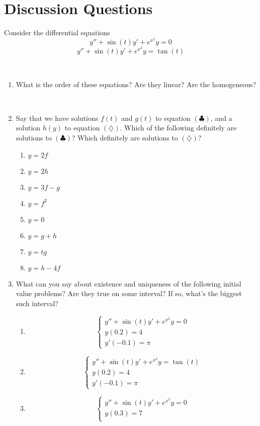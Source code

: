 \documentclass[12pt]{amsart}
\begin{document}
	
	\thispagestyle{empty}
	

	
	\section*{Discussion Questions}
	
	
	Consider the differential equations
	\begin{equation}\tag{$\clubsuit$} y'' + \sin(t) y' + e^{x^2} y = 0 \end{equation}
		\begin{equation}\tag{$\diamondsuit$} y'' + \sin(t) y' + e^{x^2} y = \tan(t) \end{equation}
	
	\
	
\begin{enumerate}
\item What is the order of these equations? Are they linear? Are the homogeneous?

\

\item Say that we have solutions $f(t)$ and $g(t)$  to equation $(\clubsuit)$, and a solution $h(y)$  to equation $(\diamondsuit)$. 
Which of the following definitely are solutions to $(\clubsuit)$? Which definitely are solutions to $(\diamondsuit)$? 
\begin{multicols}{4}
\begin{enumerate}
\item $y= 2f$
\item $y= 2h$
\item $y=3f-g$
\item $y=f^2$
\item $y=0$
\item $y=g+h$
\item $y=tg$
\item $y=h-4f$
\end{enumerate}
\end{multicols}

\item What can you say about existence and uniqueness of the following initial value problems? Are they true on some interval? If so, what's the biggest such interval?
\begin{multicols}{3}
\begin{enumerate}
\item \[ \begin{cases} y'' + \sin(t) y' + e^{x^2} y = 0 \\ 
y(0.2) = 4 \\
y'(-0.1) = \pi
\end{cases}\]
\item \[ \begin{cases} y'' + \sin(t) y' + e^{x^2} y = \tan(t) \\ 
y(0.2) = 4 \\
y'(-0.1) = \pi
\end{cases}\]
\item \[ \begin{cases} y'' + \sin(t) y' + e^{x^2} y = 0 \\ 
y(0.3) = 7 \\
\end{cases}\]


\end{enumerate}
\end{multicols}
\end{enumerate}
\end{document}
